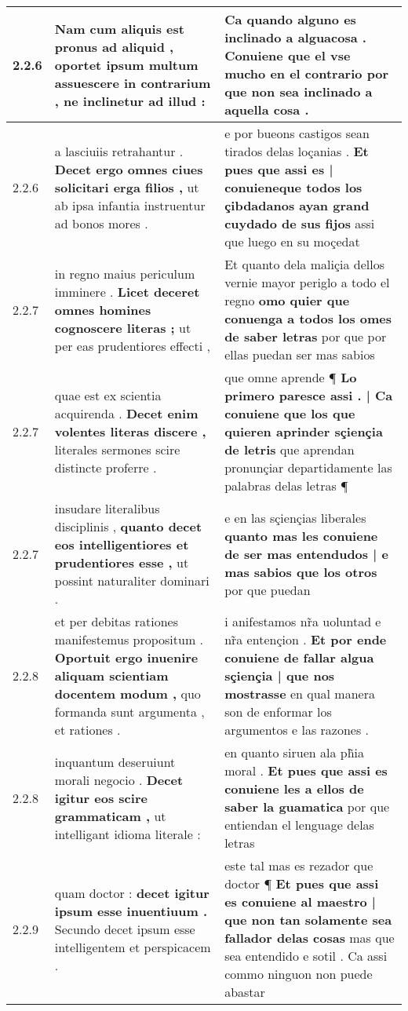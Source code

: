 \begin{tabular}{|p{1cm}|p{6.5cm}|p{6.5cm}|}
2.2.6 & Nam cum aliquis est pronus ad aliquid , \textbf{ oportet ipsum multum assuescere in contrarium , } ne inclinetur ad illud : & Ca quando alguno es inclinado a alguacosa . \textbf{ Conuiene que el vse mucho en el contrario } por que non sea inclinado a aquella cosa . \\\hline
2.2.6 & a lasciuiis retrahantur . \textbf{ Decet ergo omnes ciues solicitari erga filios , } ut ab ipsa infantia instruentur ad bonos mores . & e por bueons castigos sean tirados delas loçanias . \textbf{ Et pues que assi es | conuieneque todos los çibdadanos ayan grand cuydado de sus fijos } assi que luego en su moçedat \\\hline
2.2.7 & in regno maius periculum imminere . \textbf{ Licet deceret omnes homines cognoscere literas ; } ut per eas prudentiores effecti , & Et quanto dela maliçia dellos vernie mayor periglo a todo el regno \textbf{ omo quier que conuenga a todos los omes de saber letras } por que por ellas puedan ser mas sabios \\\hline
2.2.7 & quae est ex scientia acquirenda . \textbf{ Decet enim volentes literas discere , } literales sermones scire distincte proferre . & que omne aprende ¶ \textbf{ Lo primero paresce assi . | Ca conuiene que los que quieren aprinder sçiençia de letris } que aprendan pronunçiar departidamente las palabras delas letras ¶ \\\hline
2.2.7 & insudare literalibus disciplinis , \textbf{ quanto decet eos intelligentiores et prudentiores esse , } ut possint naturaliter dominari . & e en las sçiençias liberales \textbf{ quanto mas les conuiene de ser mas entendudos | e mas sabios que los otros } por que puedan \\\hline
2.2.8 & et per debitas rationes manifestemus propositum . \textbf{ Oportuit ergo inuenire aliquam scientiam docentem modum , } quo formanda sunt argumenta , et rationes . & i anifestamos nr̃a uoluntad e nr̃a entençion . \textbf{ Et por ende conuiene de fallar algua sçiençia | que nos mostrasse } en qual manera son de enformar los argumentos e las razones . \\\hline
2.2.8 & inquantum deseruiunt morali negocio . \textbf{ Decet igitur eos scire grammaticam , } ut intelligant idioma literale : & en quanto siruen ala ph̃ia moral . \textbf{ Et pues que assi es conuiene les a ellos de saber la guamatica } por que entiendan el lenguage delas letras \\\hline
2.2.9 & quam doctor : \textbf{ decet igitur ipsum esse inuentiuum . } Secundo decet ipsum esse intelligentem et perspicacem . & este tal mas es rezador que doctor ¶ \textbf{ Et pues que assi es conuiene al maestro | que non tan solamente sea fallador delas cosas } mas que sea entendido e sotil . Ca assi commo ninguon non puede abastar \\\hline

\end{tabular}

